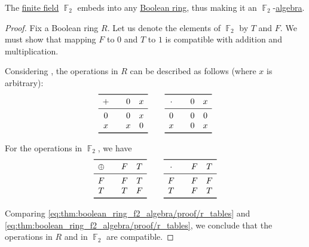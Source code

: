 \begin{proposition}\label{thm:boolean_ring_f2_algebra}
  The \hyperref[def:finite_field]{finite field} \( \BbbF_2 \) embeds into any \hyperref[def:boolean_ring]{Boolean ring}, thus making it an \( \BbbF_2 \)-\hyperref[def:algebra_over_ring]{algebra}.
\end{proposition}
\begin{proof}
  Fix a Boolean ring \( R \). Let us denote the elements of \( \BbbF_2 \) by \( T \) and \( F \). We must show that mapping \( F \) to \( 0 \) and \( T \) to \( 1 \) is compatible with addition and multiplication.

  Considering , the operations in \( R \) can be described as follows (where \( x \) is arbitrary):
  \begin{equation}\label{eq:thm:boolean_ring_f2_algebra/proof/r_tables}
    \begin{array}{c !{\quad} cc}
      \toprule
      + & 0 & x \\
      \midrule
      0 & 0 & x \\
      x & x & 0 \\
      \bottomrule
    \end{array}
    \qquad
    \begin{array}{c !{\quad} cc}
      \toprule
      \cdot & 0 & x \\
      \midrule
      0     & 0 & 0 \\
      x     & 0 & x \\
      \bottomrule
    \end{array}
  \end{equation}

  For the operations in \( \BbbF_2 \), we have
  \begin{equation}\label{eq:thm:boolean_ring_f2_algebra/proof/f2_tables}
    \begin{array}{c !{\quad} cc}
      \toprule
      \oplus & F & T \\
      \midrule
      F      & F & T \\
      T      & T & F \\
      \bottomrule
    \end{array}
    \qquad
    \begin{array}{c !{\quad} cc}
      \toprule
      \cdot & F & T \\
      \midrule
      F     & F & F \\
      T     & F & T \\
      \bottomrule
    \end{array}
  \end{equation}

  Comparing \eqref{eq:thm:boolean_ring_f2_algebra/proof/r_tables} and \eqref{eq:thm:boolean_ring_f2_algebra/proof/r_tables}, we conclude that the operations in \( R \) and in \( \BbbF_2 \) are compatible.
\end{proof}

